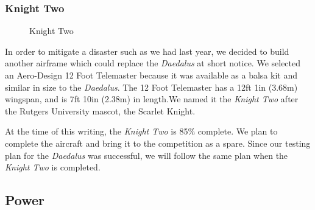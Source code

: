 \documentclass[pdftex,10pt,letter]{article}
\begin{document}
\subsubsection{Knight Two}
\begin{figure}
	\centering
  	\label{fig:knighttwo}
  	\caption[Knight Two]{Knight Two}

\end{figure}

In order to mitigate a disaster such as we had last year, we decided to build another airframe which could replace the \emph{Daedalus} at short notice. We selected an Aero-Design 12 Foot Telemaster \cite{aerodesign} because it was available as a balsa kit and similar in size to the \emph{Daedalus}. The 12 Foot Telemaster has a 12ft 1in (3.68m) wingspan, and is 7ft 10in (2.38m) in length.We named it the \emph{Knight Two} after the Rutgers University mascot, the Scarlet Knight.

At the time of this writing, the \emph{Knight Two} is 85\% complete. We plan to complete the aircraft and bring it to the competition as a spare.  
Since our testing plan for the \emph{Daedalus} was successful, we will follow the same plan when the \emph{Knight Two} is completed.

\subsection{Power}
\end{document}
